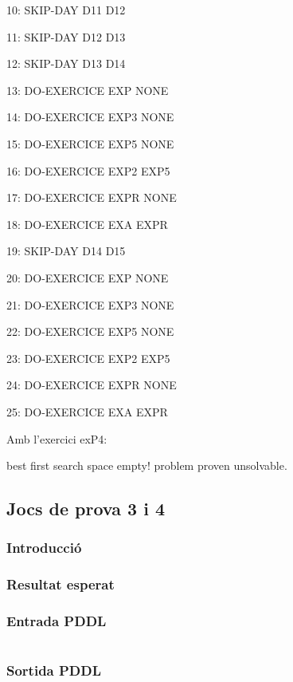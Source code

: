 \documentclass[a4paper,12pt, UTF-8]{article}
\begin{document}
    10: SKIP-DAY D11 D12
    
    11: SKIP-DAY D12 D13
    
    12: SKIP-DAY D13 D14
    
    13: DO-EXERCICE EXP NONE
    
    14: DO-EXERCICE EXP3 NONE
    
    15: DO-EXERCICE EXP5 NONE
    
    16: DO-EXERCICE EXP2 EXP5
    
    17: DO-EXERCICE EXPR NONE
    
    18: DO-EXERCICE EXA EXPR
    
    19: SKIP-DAY D14 D15
    
    20: DO-EXERCICE EXP NONE
    
    21: DO-EXERCICE EXP3 NONE
    
    22: DO-EXERCICE EXP5 NONE
    
    23: DO-EXERCICE EXP2 EXP5
    
    24: DO-EXERCICE EXPR NONE
    
    25: DO-EXERCICE EXA EXPR
    
 \setlength{\parskip}{0.7em}

	Amb l'exercici exP4:
	
	best first search space empty! problem proven unsolvable.
	
\subsection{Jocs de prova 3 i 4}
\subsubsection{Introducció}


\subsubsection{Resultat esperat}



\subsubsection{Entrada PDDL}
\begin{lstlisting}

\end{lstlisting}

\subsubsection{Sortida PDDL}
\setlength{\parskip}{0em}


\setlength{\parskip}{0.7em}
\end{document}
